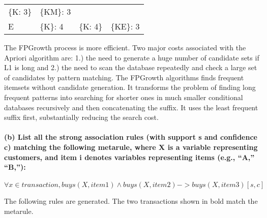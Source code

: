 \documentclass[11pt]{article}
\begin{document}
\begin{longtable}[]{@{}llll@{}}
\begin{minipage}[t]{0.22\columnwidth}
\{K: 3\}\strut
\end{minipage} & \begin{minipage}[t]{0.25\columnwidth}\raggedright\strut
\{KM\}: 3\strut
\end{minipage}\tabularnewline
\begin{minipage}[t]{0.06\columnwidth}\raggedright\strut
E\strut
\end{minipage} & \begin{minipage}[t]{0.36\columnwidth}\raggedright\strut
\{K\}: 4\strut
\end{minipage} & \begin{minipage}[t]{0.22\columnwidth}\raggedright\strut
\{K: 4\}\strut
\end{minipage} & \begin{minipage}[t]{0.25\columnwidth}\raggedright\strut
\{KE\}: 3\strut
\end{minipage}\tabularnewline
\bottomrule
\end{longtable}

    The FPGrowth process is more efficient. Two major costs associated with
the Apriori algorithm are: 1.) the need to generate a huge number of
candidate sets if L1 is long and 2.) the need to scan the database
repeatedly and check a large set of candidates by pattern matching. The
FPGrowth algorithms finds frequent itemsets without candidate
generation. It transforms the problem of finding long frequent patterns
into searching for shorter ones in much smaller conditional databases
recursively and then concatenating the suffix. It uses the least
frequent suffix first, substantially reducing the search cost.

    \paragraph{(b) List all the strong association rules (with support s and
confidence c) matching the following metarule, where X is a variable
representing customers, and item i denotes variables representing items
(e.g., ``A,''
``B,''):}\label{b-list-all-the-strong-association-rules-with-support-s-and-confidence-c-matching-the-following-metarule-where-x-is-a-variable-representing-customers-and-item-i-denotes-variables-representing-items-e.g.-a-b}

\[∀x∈transaction,buys(X,item1)∧buys(X,item2)->buys(X,item3) [s,c]\]

    The following rules are generated. The two transactions shown in bold
match the metarule.
\end{document}
